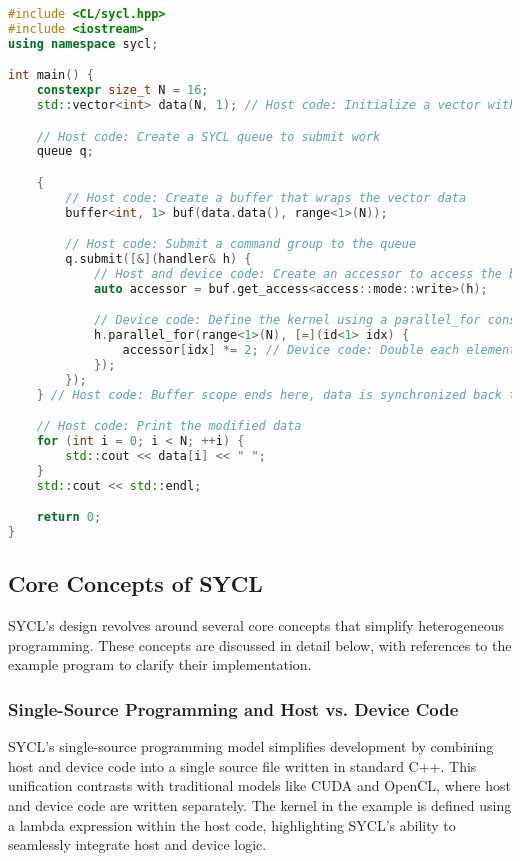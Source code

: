 \begin{lstlisting}[language=C++, caption={A Simple SYCL Program}, label={lst:sycl-example}]
#include <CL/sycl.hpp>
#include <iostream>
using namespace sycl;

int main() {
    constexpr size_t N = 16;
    std::vector<int> data(N, 1); // Host code: Initialize a vector with 16 elements, all set to 1

    // Host code: Create a SYCL queue to submit work
    queue q;

    {
        // Host code: Create a buffer that wraps the vector data
        buffer<int, 1> buf(data.data(), range<1>(N));

        // Host code: Submit a command group to the queue
        q.submit([&](handler& h) {
            // Host and device code: Create an accessor to access the buffer in write mode
            auto accessor = buf.get_access<access::mode::write>(h);

            // Device code: Define the kernel using a parallel_for construct
            h.parallel_for(range<1>(N), [=](id<1> idx) {
                accessor[idx] *= 2; // Device code: Double each element
            });
        });
    } // Host code: Buffer scope ends here, data is synchronized back to the host

    // Host code: Print the modified data
    for (int i = 0; i < N; ++i) {
        std::cout << data[i] << " ";
    }
    std::cout << std::endl;

    return 0;
}
\end{lstlisting}

\subsection{Core Concepts of SYCL}

SYCL's design revolves around several core concepts that simplify heterogeneous programming. These concepts are discussed in detail
below, with references to the example program to clarify their implementation.

\subsubsection{Single-Source Programming and Host vs. Device Code}

SYCL’s single-source programming model simplifies development by combining host and device code into a single source file written
in standard C++. This unification contrasts with traditional models like CUDA and OpenCL, where host and device code are written
separately. The kernel in the example is defined using a lambda expression within the host code, highlighting SYCL’s ability to
seamlessly integrate host and device logic.

